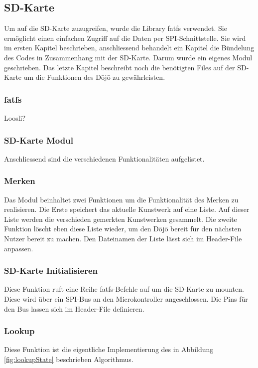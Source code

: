 \subsection{SD-Karte}\label{sec:sdKarte}
Um auf die SD-Karte zuzugreifen, wurde die Library fatfs verwendet. Sie ermöglicht einen einfachen Zugriff auf die Daten per SPI-Schnittstelle. Sie wird im ersten Kapitel beschrieben, anschliessend behandelt ein Kapitel die Bündelung des Codes in Zusammenhang mit der SD-Karte. Darum wurde ein eigenes Modul geschrieben. Das letzte Kapitel beschreibt noch die benötigten Files auf der SD-Karte um die Funktionen des Dōjō zu gewährleisten.

\subsubsection{fatfs}
Loosli?

\subsubsection{SD-Karte Modul}
Anschliessend sind die verschiedenen Funktionalitäten aufgelistet.

\subsubsection*{Merken}
Das Modul beinhaltet zwei Funktionen um die Funktionalität des Merken zu realisieren. Die Erste speichert das aktuelle Kunstwerk auf eine Liste. Auf dieser Liste werden die verschieden gemerkten Kunstwerken gesammelt. Die zweite Funktion löscht eben diese Liste wieder, um den Dōjō bereit für den nächsten Nutzer bereit zu machen. Den Dateinamen der Liste lässt sich im Header-File anpassen.

\subsubsection*{SD-Karte Initialisieren}
Diese Funktion ruft eine Reihe fatfs-Befehle auf um die SD-Karte zu mounten. Diese wird über ein SPI-Bus an den Microkontroller angeschlossen. Die Pins für den Bus lassen sich im Header-File definieren.

\subsubsection*{Lookup}
Diese Funktion ist die eigentliche Implementierung des in Abbildung \ref{fig:lookupState} beschrieben Algorithmus.

